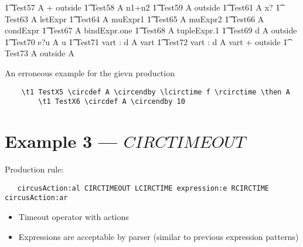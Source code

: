 \documentclass{article}
\begin{document}
\begin{circusaction}
   \t1 Test57 \circdef A \circendby {} + outside \rcirctime 
   \also
   \t1 Test58 \circdef A \circendby \lcirctime n1+n2 \rcirctime 
   \also
   \t1 Test59 \circdef A \circendby \lcirctime outside \rcirctime 
   \also
   \t1 Test61 \circdef A \circendby \lcirctime x? \rcirctime 
   \also
   \t1 Test63 \circdef A \circendby \lcirctime letExpr \rcirctime 
   \also
   \t1 Test64 \circdef A \circendby \lcirctime muExpr1 \rcirctime 
   \also
   \t1 Test65 \circdef A \circendby \lcirctime muExpr2 \rcirctime 
   \also
   \t1 Test66 \circdef A \circendby \lcirctime condExpr \rcirctime 
   \also
   \t1 Test67 \circdef A \circendby \lcirctime bindExpr.one \rcirctime 
   \also
   \t1 Test68 \circdef A \circendby \lcirctime tupleExpr.1 \rcirctime 
   \also
   \t1 Test69 \circdef d \then A \circendby \lcirctime outside \rcirctime 
   \also
   \t1 Test70 \circdef e?u \then A \circendby \lcirctime u \rcirctime 
   \also
   \t1 Test71 \circdef \circvres vart : \nat \circspot  d \then A \circendby \lcirctime vart 
   \rcirctime 
   \also
   \t1 Test72 \circdef \circvres vart : \nat \circspot  d \then A \circendby \lcirctime vart + 
   outside \rcirctime 
   \also
   \t1 Test73 \circdef  A \circendby \lcirctime outside \rcirctime \circseq A 
\end{circusaction}

An erroneous example for the gievn production 
\begin{verbatim}
	\t1 TestX5 \circdef A \circendby \lcirctime f \rcirctime \then A
        \t1 TestX6 \circdef A \circendby 10
\end{verbatim}


\section{Example 3 --- $CIRCTIMEOUT$}


Production rule:
\begin{verbatim}
   circusAction:al CIRCTIMEOUT LCIRCTIME expression:e RCIRCTIME  circusAction:ar
\end{verbatim}

\begin{itemize}
	\item Timeout operator with actions
	\item Expressions are acceptable by parser (similar to previous expression patterns)
\end{itemize}
\end{document}
